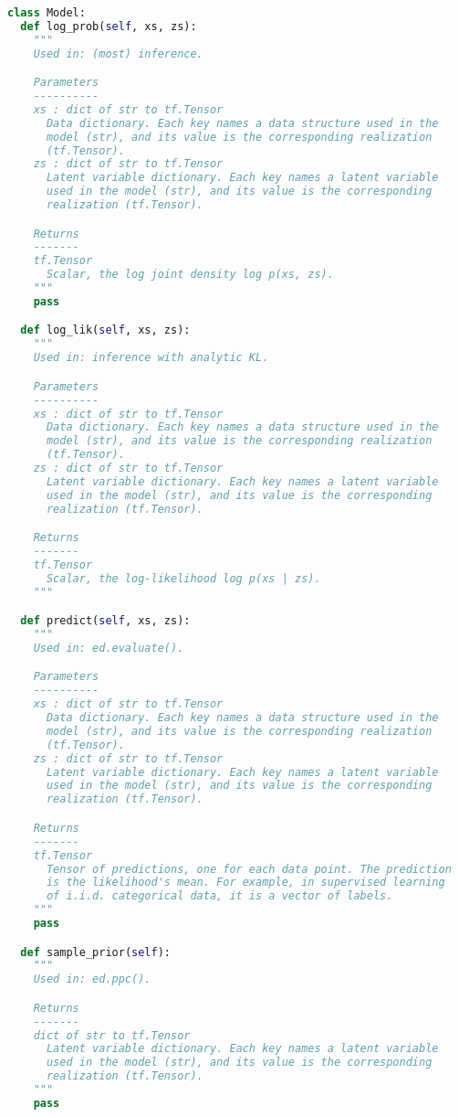 \begin{lstlisting}[language=Python]
class Model:
  def log_prob(self, xs, zs):
    """
    Used in: (most) inference.

    Parameters
    ----------
    xs : dict of str to tf.Tensor
      Data dictionary. Each key names a data structure used in the
      model (str), and its value is the corresponding realization
      (tf.Tensor).
    zs : dict of str to tf.Tensor
      Latent variable dictionary. Each key names a latent variable
      used in the model (str), and its value is the corresponding
      realization (tf.Tensor).

    Returns
    -------
    tf.Tensor
      Scalar, the log joint density log p(xs, zs).
    """
    pass

  def log_lik(self, xs, zs):
    """
    Used in: inference with analytic KL.

    Parameters
    ----------
    xs : dict of str to tf.Tensor
      Data dictionary. Each key names a data structure used in the
      model (str), and its value is the corresponding realization
      (tf.Tensor).
    zs : dict of str to tf.Tensor
      Latent variable dictionary. Each key names a latent variable
      used in the model (str), and its value is the corresponding
      realization (tf.Tensor).

    Returns
    -------
    tf.Tensor
      Scalar, the log-likelihood log p(xs | zs).
    """

  def predict(self, xs, zs):
    """
    Used in: ed.evaluate().

    Parameters
    ----------
    xs : dict of str to tf.Tensor
      Data dictionary. Each key names a data structure used in the
      model (str), and its value is the corresponding realization
      (tf.Tensor).
    zs : dict of str to tf.Tensor
      Latent variable dictionary. Each key names a latent variable
      used in the model (str), and its value is the corresponding
      realization (tf.Tensor).

    Returns
    -------
    tf.Tensor
      Tensor of predictions, one for each data point. The prediction
      is the likelihood's mean. For example, in supervised learning
      of i.i.d. categorical data, it is a vector of labels.
    """
    pass

  def sample_prior(self):
    """
    Used in: ed.ppc().

    Returns
    -------
    dict of str to tf.Tensor
      Latent variable dictionary. Each key names a latent variable
      used in the model (str), and its value is the corresponding
      realization (tf.Tensor).
    """
    pass


\end{lstlisting}
